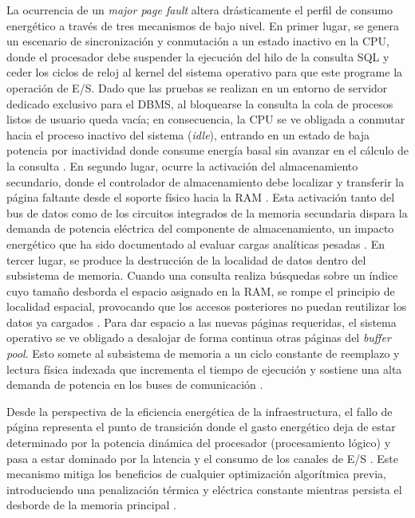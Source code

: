 \documentclass[12pt, letter paper]{report}
\begin{document}
        La ocurrencia de un \textit{major page fault} altera drásticamente el
        perfil de consumo energético a través de tres mecanismos de bajo nivel.
        En primer lugar, se genera un escenario de sincronización y
        conmutación a un estado inactivo en la CPU, donde el procesador debe
        suspender la ejecución del hilo de la consulta SQL y ceder los ciclos
        de reloj al kernel del sistema operativo para que este programe la
        operación de E/S. Dado que las pruebas se realizan en un entorno de
        servidor dedicado exclusivo para el DBMS, al bloquearse la consulta la
        cola de procesos listos de usuario queda vacía; en consecuencia, la CPU
        se ve obligada a conmutar hacia el proceso inactivo del sistema
        (\textit{idle}), entrando en un estado de baja potencia por inactividad
        donde consume energía basal sin avanzar en el cálculo de la consulta
        \cite{niemann2012}. En segundo lugar, ocurre la activación del
        almacenamiento secundario, donde el controlador de almacenamiento debe
        localizar y transferir la página faltante desde el soporte físico hacia
        la RAM \cite{elmasri2015fundamentals}. Esta activación tanto del bus de
        datos como de los circuitos integrados de la memoria secundaria dispara
        la demanda de potencia eléctrica del componente de almacenamiento, un
        impacto energético que ha sido documentado al evaluar cargas analíticas
        pesadas \cite{lang2012energy}. En tercer lugar, se produce la
        destrucción de la localidad de datos dentro del subsistema de memoria.
        Cuando una consulta realiza búsquedas sobre un índice cuyo tamaño
        desborda el espacio asignado en la RAM, se rompe el principio de
        localidad espacial, provocando que los accesos posteriores no puedan
        reutilizar los datos ya cargados \cite{silberschatz2019operating}. Para
        dar espacio a las nuevas páginas requeridas, el sistema operativo se ve
        obligado a desalojar de forma continua otras páginas del \textit{buffer 
        pool}. Esto somete al subsistema de memoria a un ciclo constante de 
        reemplazo y lectura física indexada que incrementa el tiempo de
        ejecución y sostiene una alta demanda de potencia en los buses de
        comunicación \cite{tanenbaum2014modern}.

        Desde la perspectiva de la eficiencia energética de la infraestructura,
        el fallo de página representa el punto de transición donde el gasto
        energético deja de estar determinado por la potencia dinámica del
        procesador (procesamiento lógico) y pasa a estar dominado por la
        latencia y el consumo de los canales de E/S \cite{niemann2012,
        lang2012energy}. Este mecanismo mitiga los beneficios de cualquier
        optimización algorítmica previa, introduciendo una penalización térmica
        y eléctrica constante mientras persista el desborde de la memoria
        principal \cite{guoenergy-efficient2023}.
\end{document}
